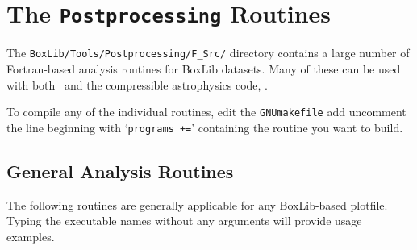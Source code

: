 \section{The {\tt Postprocessing} Routines}
\label{sec:analysis}

The {\tt BoxLib/Tools/Postprocessing/F\_Src/} directory contains a large
number of Fortran-based analysis routines for BoxLib datasets.  Many
of these can be used with both \maestro\ and the compressible
astrophysics code, \castro.

To compile any of the individual routines, edit the {\tt GNUmakefile}
add uncomment the line beginning with `{\tt programs +=}' containing
the routine you want to build.

\subsection{General Analysis Routines}

The following routines are generally applicable for any BoxLib-based
plotfile.  Typing the executable names without any arguments will
provide usage examples.

